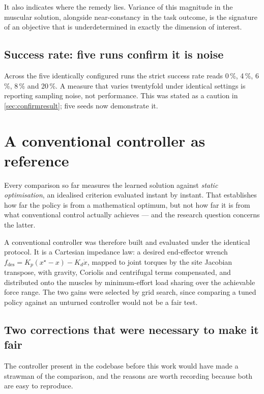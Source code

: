 It also indicates where the remedy lies. Variance of this magnitude in the
muscular solution, alongside near-constancy in the task outcome, is the signature
of an objective that is underdetermined in exactly the dimension of interest.

\subsection{Success rate: five runs confirm it is noise}

Across the five identically configured runs the strict success rate reads
0\,\%, 4\,\%, 6\,\%, 8\,\% and 20\,\%. A measure that varies twentyfold under
identical settings is reporting sampling noise, not performance. This was stated
as a caution in \cref{sec:confirmresult}; five seeds now demonstrate it.

\section{A conventional controller as reference}
\label{sec:conventional}

Every comparison so far measures the learned solution against \emph{static
optimisation}, an idealised criterion evaluated instant by instant. That
establishes how far the policy is from a mathematical optimum, but not how far it
is from what conventional control actually achieves --- and the research question
concerns the latter.

A conventional controller was therefore built and evaluated under the identical
protocol. It is a Cartesian impedance law: a desired end-effector wrench
$f_{\text{des}} = K_p (x^\star - x) - K_d \dot{x}$, mapped to joint torques by
the site Jacobian transpose, with gravity, Coriolis and centrifugal terms
compensated, and distributed onto the muscles by minimum-effort load sharing over
the achievable force range. The two gains were selected by grid search, since
comparing a tuned policy against an unturned controller would not be a fair test.

\subsection{Two corrections that were necessary to make it fair}

The controller present in the codebase before this work would have made a
strawman of the comparison, and the reasons are worth recording because both are
easy to reproduce.

